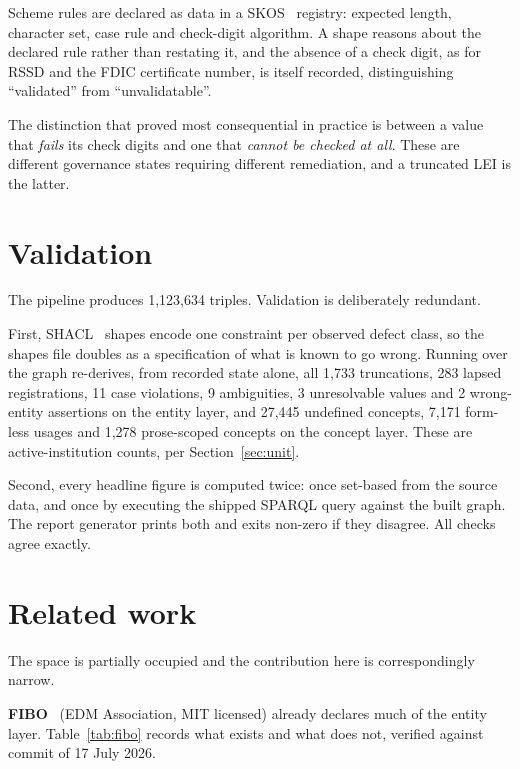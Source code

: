 \documentclass[11pt]{article}
\begin{document}
Scheme rules are declared as data in a SKOS~\cite{skos} registry: expected length, character set, case rule and check-digit algorithm. A shape reasons about the declared rule rather than restating it, and the absence of a check digit, as for RSSD and the FDIC certificate number, is itself recorded, distinguishing ``validated'' from ``unvalidatable''.

The distinction that proved most consequential in practice is between a value that \emph{fails} its check digits and one that \emph{cannot be checked at all}. These are different governance states requiring different remediation, and a truncated LEI is the latter.

\section{Validation}
\label{sec:validation}

The pipeline produces 1,123,634 triples. Validation is deliberately redundant.

First, SHACL~\cite{shacl} shapes encode one constraint per observed defect class, so the shapes file doubles as a specification of what is known to go wrong. Running  over the graph re-derives, from recorded state alone, all 1,733 truncations, 283 lapsed registrations, 11 case violations, 9 ambiguities, 3 unresolvable values and 2 wrong-entity assertions on the entity layer, and 27,445 undefined concepts, 7,171 form-less usages and 1,278 prose-scoped concepts on the concept layer. These are active-institution counts, per Section~\ref{sec:unit}.

Second, every headline figure is computed twice: once set-based from the source data, and once by executing the shipped SPARQL query against the built graph. The report generator prints both and exits non-zero if they disagree. All checks agree exactly.

\section{Related work}

The space is partially occupied and the contribution here is correspondingly narrow.

\textbf{FIBO}~\cite{fibo} (EDM Association, MIT licensed) already declares much of the entity layer. Table~\ref{tab:fibo} records what exists and what does not, verified against commit  of 17 July 2026.
\end{document}
